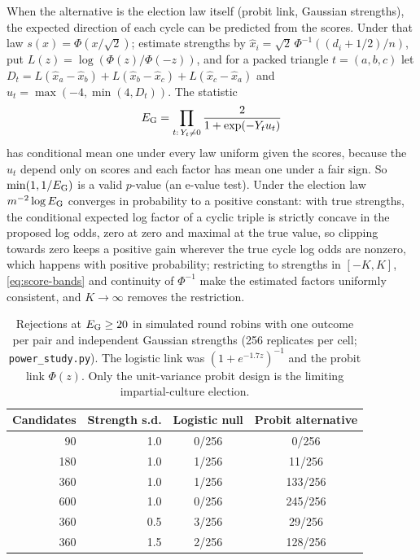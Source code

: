 \documentclass[11pt,a4paper]{article}
\theoremstyle{definition}
\begin{document}
When the alternative is the election law itself (probit link, Gaussian strengths), the expected direction of each cycle can be predicted from the scores. Under that law $s(x)=\Phi(x/\sqrt2)$; estimate strengths by $\widehat x_i=\sqrt2\,\Phi^{-1}((d_i+1/2)/n)$, put $L(z)=\log(\Phi(z)/\Phi(-z))$, and for a packed triangle $t=(a,b,c)$ let $D_t=L(\widehat x_a-\widehat x_b)+L(\widehat x_b-\widehat x_c)+L(\widehat x_c-\widehat x_a)$ and $u_t=\max(-4,\min(4,D_t))$. The statistic
\begin{equation}\label{eq:targeted}
 E_{\rm G}=\prod_{t:\,Y_t\ne0}\frac{2}{1+\exp(-Y_tu_t)}
\end{equation}
has conditional mean one under every law uniform given the scores, because the $u_t$ depend only on scores and each factor has mean one under a fair sign. So $\min(1,1/E_{\rm G})$ is a valid $p$-value (an e-value test). Under the election law $m^{-2}\log E_{\rm G}$ converges in probability to a positive constant: with true strengths, the conditional expected log factor of a cyclic triple is strictly concave in the proposed log odds, zero at zero and maximal at the true value, so clipping towards zero keeps a positive gain wherever the true cycle log odds are nonzero, which happens with positive probability; restricting to strengths in $[-K,K]$, \eqref{eq:score-bands} and continuity of $\Phi^{-1}$ make the estimated factors uniformly consistent, and $K\to\infty$ removes the restriction.

\begin{table}[htbp]
\centering
\begin{tabular}{rrcc}
\toprule
Candidates & Strength s.d. & Logistic null & Probit alternative\\
\midrule
90  & 1.0 & 0/256 & 0/256\\
180 & 1.0 & 1/256 & 11/256\\
360 & 1.0 & 1/256 & 133/256\\
600 & 1.0 & 0/256 & 245/256\\
360 & 0.5 & 3/256 & 29/256\\
360 & 1.5 & 2/256 & 128/256\\
\bottomrule
\end{tabular}
\caption{Rejections at $E_{\rm G}\ge20$ in simulated round robins with one outcome per pair and independent Gaussian strengths (256 replicates per cell; \texttt{power\_study.py}). The logistic link was $(1+e^{-1.7z})^{-1}$ and the probit link $\Phi(z)$. Only the unit-variance probit design is the limiting impartial-culture election.}\label{tab:power}
\end{table}
\end{document}
